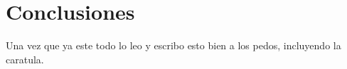 \section{Conclusiones}

Una vez que ya este todo lo leo y escribo esto bien a los pedos, incluyendo la caratula.